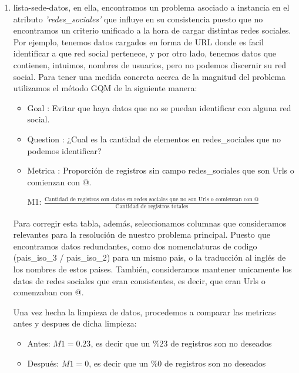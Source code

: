 \documentclass[10pt,a4paper]{article}
\begin{document}
\begin{enumerate}
	\item lista-sede-datos, en ella, encontramos un problema asociado a instancia en el atributo \textit{'redes\_sociales'} que influye en su consistencia puesto que no encontramos un criterio unificado a la hora de cargar distintas redes sociales. Por ejemplo, tenemos datos cargados en forma de URL donde es facil identificar a que red social pertenece, y por otro lado, tenemos datos que contienen, intuimos, nombres de usuarios, pero no podemos discernir su red social. Para tener una medida concreta acerca de la magnitud del problema utilizamos el método GQM de la siguiente manera:
\begin{itemize}
	\item Goal : Evitar que haya datos que no se puedan identificar con alguna red social.
	\item Question : ¿Cual es la cantidad de elementos en redes\_sociales que no podemos identificar?
	\item Metrica :  Proporción de registros sin campo redes\_sociales que son Urls o comienzan con @.
        
        \begin{center}          
        M1: $ \frac{\text{Cantidad de registros con datos en redes\_sociales que no son Urls o comienzan con @} }{\text{Cantidad de registros totales}} $
        \end{center}
    
\end{itemize}
Para corregir esta tabla, además, seleccionamos columnas que consideramos relevantes para la resolución de nuestro problema principal. Puesto que encontramos datos redundantes, como dos nomenclaturas de codigo (pais\_iso\_3 / pais\_iso\_2) para un mismo pais, o la traducción al inglés de los nombres de estos paises. También, consideramos mantener unicamente los datos de redes sociales que eran consistentes, es decir, que eran Urls o comenzaban con @.

Una vez hecha la limpieza de datos, procedemos a comparar las metricas antes y despues de dicha limpieza:
\begin{itemize}
    \item Antes: $M1 =  0.23$, es decir que un $\% 23$ de registros son no deseados
    \item Después: $M1 =  0$, es decir que un $\% 0$ de registros son no deseados
\end{itemize}


\end{enumerate}
\end{document}
